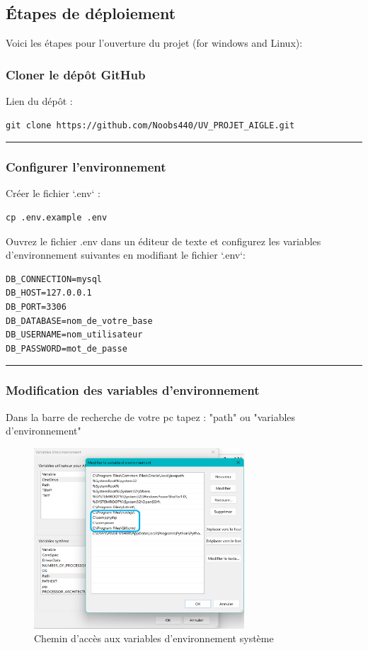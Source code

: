 \documentclass[12pt]{article}
\begin{document}
\subsection{Étapes de déploiement}

Voici les étapes pour l’ouverture du projet (for windows and Linux):

    \subsubsection{Cloner le dépôt GitHub}

Lien du dépôt :
        \begin{lstlisting}
git clone https://github.com/Noobs440/UV_PROJET_AIGLE.git
        \end{lstlisting}
\rule{\linewidth}{0.2pt}
    \subsubsection{Configurer l’environnement}

Créer le fichier `.env` :
        \begin{lstlisting}
cp .env.example .env
        \end{lstlisting}
Ouvrez le fichier .env dans un éditeur de texte et configurez les variables d'environnement suivantes
en modifiant le fichier `.env`:
        \begin{lstlisting}
DB_CONNECTION=mysql
DB_HOST=127.0.0.1
DB_PORT=3306
DB_DATABASE=nom_de_votre_base
DB_USERNAME=nom_utilisateur
DB_PASSWORD=mot_de_passe
        \end{lstlisting}
\rule{\linewidth}{0.2pt}

    \subsubsection{Modification des variables d’environnement}
Dans la barre de recherche de votre pc tapez : "path" ou "variables d'environnement"
        \begin{figure}[h] 
            \centering 
            \includegraphics[width=0.70\textwidth]{./img/path.png} 
            \caption{Chemin d'accès aux variables d’environnement système}
        \end{figure}
\end{document}
